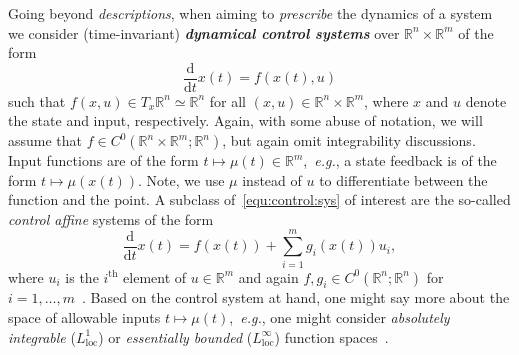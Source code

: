 \documentclass[letterpaper, 10 pt, conference]{ieeeconf}  %
\theoremstyle{mystyle}
\begin{document}
Going beyond \textit{descriptions}, when aiming to \textit{prescribe} the dynamics of a system we consider (time-invariant) \textit{\textbf{dynamical control systems}} over $\mathbb{R}^n\times \mathbb{R}^m$ of the form 
\begin{equation}
\label{equ:control:sys}
    \frac{\mathrm{d}}{\mathrm{d}t}x(t) = f(x(t),u)
\end{equation}
such that $f(x,u)\in T_x\mathbb{R}^n\simeq \mathbb{R}^n$ for all $(x,u)\in \mathbb{R}^n\times \mathbb{R}^m$, where $x$ and $u$ denote the state and input, respectively. 
Again, with some abuse of notation, we will assume that $f\in C^{0}(\mathbb{R}^n\times \mathbb{R}^m;\mathbb{R}^n)$, but again omit integrability discussions.
Input functions are of the form $t\mapsto \mu(t)\in \mathbb{R}^m$,~\textit{e.g.}, a state feedback is of the form $t\mapsto\mu(x(t))$.
Note, we use $\mu$ instead of $u$ to differentiate between the function and the point. A subclass of~\eqref{equ:control:sys} of interest are the so-called \textit{control affine} systems of the form
\begin{equation}
    \label{equ:control:sys:affine}
    \frac{\mathrm{d}}{\mathrm{d}t}x(t) = f(x(t)) + \textstyle\sum^m_{i=1}g_i(x(t))u_i,
\end{equation}
where $u_i$ is the $i^{\mathrm{th}}$ element of $u\in \mathbb{R}^m$ and again $f,g_i\in C^{0}(\mathbb{R}^n;\mathbb{R}^n)$ for $i=1,\dots,m$~\cite{nonlin}. Based on the control system at hand, one might say more about the space of allowable inputs $t\mapsto \mu(t)$,~\textit{e.g.}, one might consider \textit{absolutely integrable} ($L^1_{\mathrm{loc}}$) or \textit{essentially bounded} ($L^{\infty}_{\mathrm{loc}}$) function spaces~\cite[App.~C]{ref:sontag2013mathematical}.
\end{document}
